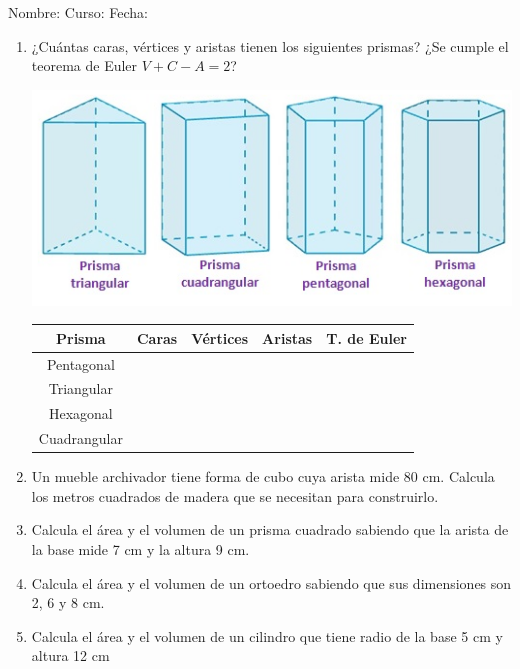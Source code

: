 \documentclass[fleqn]{article}
\newcommand{\LineaNombre}{%
\par
\vspace{\baselineskip}
Nombre:\hrulefill \; Curso: \underline{\hspace*{48pt}} \; Fecha: \underline{\hspace*{2.5cm}} \relax
\par}
\begin{document}
\LineaNombre
\begin{enumerate}
 \item ¿Cuántas caras, vértices y aristas tienen los siguientes prismas? ¿Se cumple el teorema de Euler $V+C-A=2$?
 
 \begin{minipage}{.35\textwidth}
  \includegraphics[scale=0.275]{Images/Pantallazo-2017-07-10_19-49-43.png} 
 \end{minipage}\hfill
 \begin{minipage}{.6\textwidth}
 \begin{tabular}{|c|c|c|c|c|}
 \hline 
 Prisma & Caras & Vértices & Aristas & T. de Euler\\ 
 \hline 
 Pentagonal &  &  & & \\ 
 \hline 
 Triangular &  &  &  &\\ 
 \hline 
 Hexagonal &  &  & & \\ 
 \hline 
 Cuadrangular &  &  & &  \\ 
 \hline 
 \end{tabular} 
 \end{minipage}
 \item Un mueble archivador tiene forma de cubo cuya arista mide
80 cm. Calcula los metros cuadrados de madera que se necesitan para construirlo.\noanswer
\item Calcula el área y el volumen de un prisma cuadrado sabiendo que la arista de la base mide 7 cm y la altura 9 cm.\noanswer
\newpage
\item Calcula el área y el volumen de un ortoedro sabiendo que sus dimensiones son 2, 6 y 8 cm.\noanswer
\item Calcula el área y el volumen de un cilindro que tiene radio de la base 5 cm y altura 12 cm\noanswer
 \end{enumerate}
\end{document}
